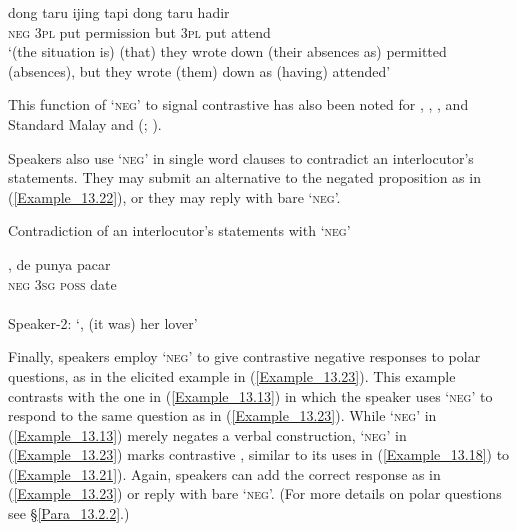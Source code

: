 \ea
\label{Example_13.21}
 {dong} {taru} {ijing} {tapi} {dong} {taru} {hadir}\\ %
 \textsc{neg}  \textsc{3pl}  put  permission  but  \textsc{3pl}  put  attend\\
 ‘(the situation is)  (that) they wrote down (their absences as) permitted (absences), but they wrote (them) down as (having) attended’ \textstyleExampleSource{[081023-004-Cv.0018]}
\z


This function of  ‘\textsc{neg}’ to signal contrastive  has also been noted for  \citep[278–279]{vanMinde.1997},  \citep[59]{Stoel.2005},  \citep[224–225]{Litamahuputty.1994}, and Standard Malay and  (\citealt[127]{Himmelmann.2005}; \citealt{Kroeger.2012}).



Speakers also use  ‘\textsc{neg}’ in single word clauses to contradict an interlocutor’s statements. They may submit an alternative to the negated proposition as in (\ref{Example_13.22}), or they may reply with bare  ‘\textsc{neg}’.


\begin{styleExampleTitle}
Contradiction of an interlocutor’s statements with  ‘\textsc{neg}’
\end{styleExampleTitle}

\ea
\label{Example_13.22}
 {,} {de} {punya} {pacar}\\ %
 {}  \textsc{neg}  \textsc{3sg}  \textsc{poss}  date\\
\\
Speaker-2: ‘, (it was) her lover’ \textstyleExampleSource{[081006-022-CvEx.0043-0045]}
\z


Finally, speakers employ  ‘\textsc{neg}’ to give contrastive negative responses to polar questions, as in the elicited example in (\ref{Example_13.23}). This example contrasts with the one in (\ref{Example_13.13}) in which the speaker uses  ‘\textsc{neg}’ to respond to the same question as in (\ref{Example_13.23}). While  ‘\textsc{neg}’ in (\ref{Example_13.13}) merely negates a verbal construction,  ‘\textsc{neg}’ in (\ref{Example_13.23}) marks contrastive , similar to its uses in (\ref{Example_13.18}) to (\ref{Example_13.21}). Again, speakers can add the correct response as in (\ref{Example_13.23}) or reply with bare  ‘\textsc{neg}’. (For more details on polar questions see §\ref{Para_13.2.2}.)

